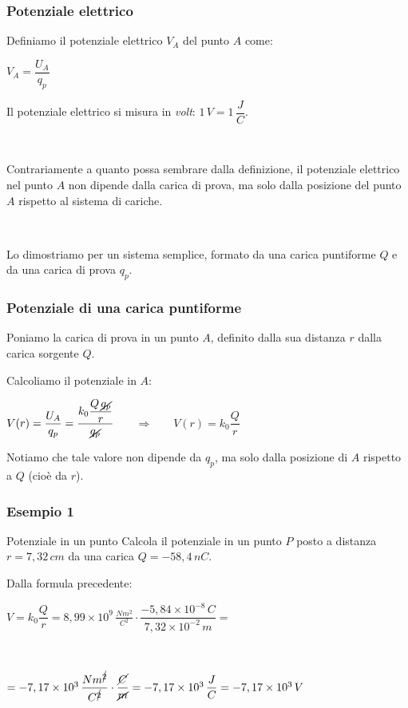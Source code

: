 \documentclass[]{beamer}
\theoremstyle{plain}
\begin{document}
\begin{frame}
\frametitle{Potenziale elettrico}
Definiamo il potenziale elettrico $ V_A $ del punto $ A $ come:
\begin{center}
\colorbox{blue!30}{$ V_A = \dfrac{U_A}{q_p} $}
\end{center}
Il potenziale elettrico si misura in \emph{volt}: $ 1 \, V = 1 \, \dfrac{J}{C} $.\pause

~

Contrariamente a quanto possa sembrare dalla definizione, \alert<2>{il potenziale elettrico nel punto $ A $ non dipende dalla carica di prova}, ma solo dalla posizione del punto $ A $ rispetto al sistema di cariche.
\pause

~

Lo dimostriamo per un sistema semplice, formato da \alert<3>{una carica puntiforme $ Q $ e da una carica di prova $ q_p $}.
\end{frame}


\begin{frame}
\frametitle{Potenziale di una carica puntiforme}
Poniamo la carica di prova in un punto $ A $, definito dalla sua distanza $ r $ dalla carica sorgente $ Q $.
\begin{figure}
\end{figure}\pause
Calcoliamo il potenziale in $ A $:
\begin{center}
$ V(r) = \dfrac{U_A}{q_p} = \dfrac{k_0 \dfrac{Q \, \cancel{q_p} }{r}}{\cancel{q_p}} $ ~~~\pause$ \Longrightarrow  $~~~ \colorbox{blue!30}{$ V(r) = k_0 \dfrac{Q}{r} $} 
\end{center}
Notiamo che \alert<3>{tale valore non dipende da $ q_p $, ma solo dalla posizione di $ A $ rispetto a $ Q $ (cioè da $ r $)}.
\end{frame}





\begin{frame}
\frametitle{Esempio 1}

\begin{exampleblock}{Potenziale in un punto}
{\small Calcola il potenziale in un punto $ P $ posto a distanza $ r = 7,32 \, cm $ da una carica $ Q = - 58,4 \, nC $.}
\end{exampleblock}
\pause
Dalla formula precedente:
\begin{center}
$ V = k_0 \dfrac{Q}{r} = 8,99 \times 10^9 \, \frac{Nm^2}{C^2} \cdot \dfrac{-5,84 \times 10^{-8} \, C}{7,32 \times 10^{-2} \, m} = $\pause

~

$ = - 7,17 \times 10^3 \, \dfrac{N m^{\cancel{2}}}{C^{\cancel{2}}} \cdot \dfrac{\cancel{C}}{\cancel{m}} = -7,17 \times 10^3 \, \dfrac{J}{C} = -7,17 \times 10^3 \, V $
\end{center}
\end{frame}
\end{document}
